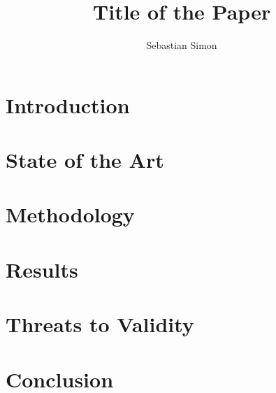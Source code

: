 \documentclass[sigconf,review,anonymous]{acmart}
\title{Title of the Paper}
\author{Sebastian Simon}
\affiliation{%
    \institution{Leipzig University}
    \country{Germany}
}
\begin{document}
\begin{abstract}
\end{abstract}

\maketitle

\section{Introduction}\label{sec:introduction}

\section{State of the Art}\label{sec:stateOfTheArt}

\section{Methodology}

\section{Results}

\section{Threats to Validity}

\section{Conclusion}

\begin{acks}
\end{acks}



\end{document}
